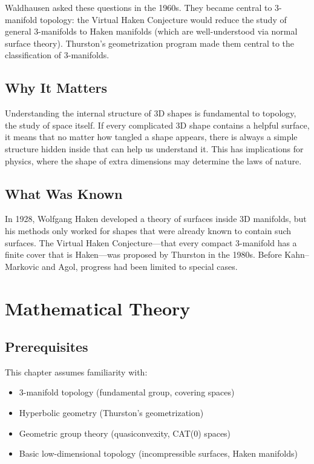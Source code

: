 \begin{historicalbox}
Waldhausen asked these questions in the 1960s. They became central to 3-manifold topology: the Virtual Haken Conjecture would reduce the study of general 3-manifolds to Haken manifolds (which are well-understood via normal surface theory). Thurston's geometrization program made them central to the classification of 3-manifolds.
\end{historicalbox}

\subsection{Why It Matters}
Understanding the internal structure of 3D shapes is fundamental to topology, the study of space itself. If every complicated 3D shape contains a helpful surface, it means that no matter how tangled a shape appears, there is always a simple structure hidden inside that can help us understand it. This has implications for physics, where the shape of extra dimensions may determine the laws of nature.

\subsection{What Was Known}
In 1928, Wolfgang Haken developed a theory of surfaces inside 3D manifolds, but his methods only worked for shapes that were already known to contain such surfaces. The Virtual Haken Conjecture---that every compact 3-manifold has a finite cover that is Haken---was proposed by Thurston in the 1980s. Before Kahn--Markovic and Agol, progress had been limited to special cases.

\section{Mathematical Theory}


\subsection{Prerequisites}
This chapter assumes familiarity with:
\begin{itemize}
\item 3-manifold topology (fundamental group, covering spaces)
\item Hyperbolic geometry (Thurston's geometrization)
\item Geometric group theory (quasiconvexity, CAT(0) spaces)
\item Basic low-dimensional topology (incompressible surfaces, Haken manifolds)
\end{itemize}

